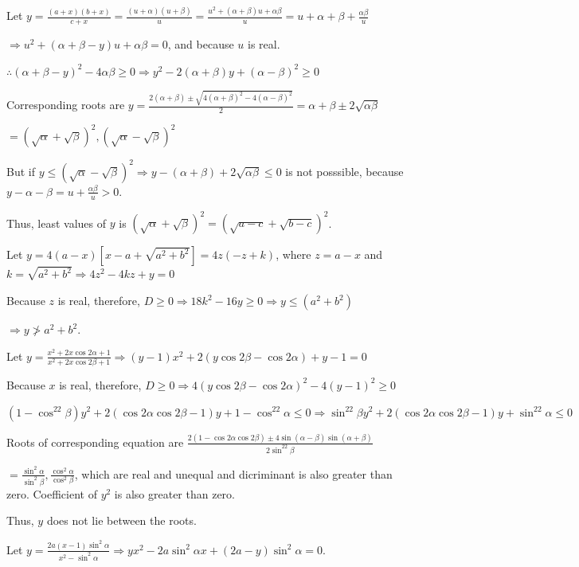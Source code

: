   Let
  $y = \frac{(a + x)(b + x)}{c + x} = \frac{(u + \alpha)(u + \beta)}{u} = \frac{u^2 + (\alpha + \beta)u +
    \alpha\beta}{u} = u + \alpha + \beta + \frac{\alpha\beta}{u}$

  $\Rightarrow u^2 + (\alpha + \beta - y)u + \alpha\beta = 0$, and because $u$ is real.

  $\therefore (\alpha + \beta - y)^2 - 4\alpha\beta \geq 0 \Rightarrow y^2 - 2(\alpha + \beta)y + (\alpha -
  \beta)^2\geq 0$

  Corresponding roots are $y = \frac{2(\alpha + \beta)\pm\sqrt{4(\alpha + \beta)^2 - 4(\alpha -
      \beta)^2}}{2} = \alpha + \beta \pm2\sqrt{\alpha\beta}$

  $= (\sqrt{\alpha} + \sqrt{\beta})^2, (\sqrt{\alpha} - \sqrt{\beta})^2$

  But if $y \leq (\sqrt{\alpha} - \sqrt{\beta})^2 \Rightarrow y - (\alpha + \beta) + 2\sqrt{\alpha\beta}
  \leq 0$ is not posssible, because $y - \alpha - \beta = u + \frac{\alpha\beta}{u} > 0$.

  Thus, least values of $y$ is $(\sqrt{\alpha} + \sqrt{\beta})^2 = (\sqrt{a - c} + \sqrt{b - c})^2$.
\item Let $y = 4(a - x)[x - a + \sqrt{a^2 + b^2}] = 4z(-z + k)$, where $z = a - x$ and $k = \sqrt{a^2 +
  b^2}\Rightarrow 4z^2 - 4kz + y = 0$

  Because $z$ is real, therefore, $D\geq 0 \Rightarrow 18k^2 - 16y\geq 0 \Rightarrow y\leq (a^2 + b^2)$

  $\Rightarrow y\ngtr a^2 + b^2$.
\item Let $y = \frac{x^2 + 2x\cos2\alpha + 1}{x^2 + 2x\cos2\beta + 1}\Rightarrow (y - 1)x^2 + 2(y\cos2\beta
  - \cos2\alpha) + y - 1 = 0$

  Because $x$ is real, therefore, $D\geq 0 \Rightarrow 4(y\cos2\beta - \cos2\alpha)^2 - 4(y - 1)^2\geq 0$

  $(1 - \cos^22\beta)y^2 + 2(\cos2\alpha\cos2\beta - 1)y + 1 - \cos^22\alpha \leq 0\Rightarrow \sin^22\beta
  y^2 + 2(\cos2\alpha\cos2\beta - 1)y + \sin^22\alpha \leq 0$

  Roots of corresponding equation are $\frac{2(1 - \cos2\alpha\cos2\beta)\pm4\sin(\alpha - \beta)\sin(\alpha
    + \beta)}{2\sin^22\beta}$

  $= \frac{\sin^2\alpha}{\sin^2\beta}, \frac{\cos^2\alpha}{\cos^2\beta}$, which are real and unequal and
  dicriminant is also greater than zero. Coefficient of $y^2$ is also greater than zero.

  Thus, $y$ does not lie between the roots.
\item Let $y = \frac{2a(x - 1)\sin^2\alpha}{x^2 -\sin^2\alpha} \Rightarrow yx^2 - 2a\sin^2\alpha x + (2a -
  y)\sin^2\alpha = 0$.

